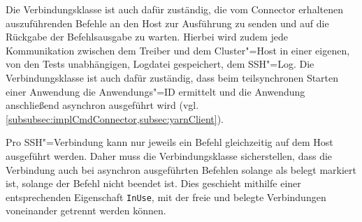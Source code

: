 Die Verbindungsklasse ist auch dafür zuständig, die vom Connector erhaltenen auszuführenden Befehle an den Host zur Ausführung zu senden und auf die Rückgabe der Befehlsausgabe zu warten.
Hierbei wird zudem jede Kommunikation zwischen dem Treiber und dem Cluster"=Host in einer eigenen, von den Tests unabhängigen, Logdatei gespeichert, dem SSH"=Log.
Die Verbindungsklasse ist auch dafür zuständig, dass beim teilsynchronen Starten einer Anwendung die Anwendungs"=ID ermittelt und die Anwendung anschließend asynchron ausgeführt wird (vgl. \cref{subsubsec:implCmdConnector,subsec:yarnClient}).

Pro SSH"=Verbindung kann nur jeweils ein Befehl gleichzeitig auf dem Host ausgeführt werden.
Daher muss die Verbindungsklasse sicherstellen, dass die Verbindung auch bei asynchron ausgeführten Befehlen solange als belegt markiert ist, solange der Befehl nicht beendet ist.
Dies geschieht mithilfe einer entsprechenden Eigenschaft \texttt{InUse}, mit der freie und belegte Verbindungen voneinander getrennt werden können.
